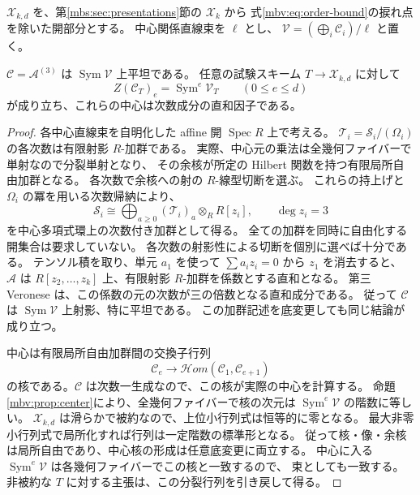 $\mathcal X_{k,d}$ を、第\ref{mbs:sec:presentations}節の $\mathcal X_k$ から
式\eqref{mbv:eq:order-bound}の捩れ点を除いた開部分とする。
中心関係直線束を $\ell$ とし、
$\mathcal V=(\bigoplus_i\mathcal C_i)/\ell$ と置く。

\begin{lemma}[相対中心多項式環上の平坦性]
\label{mbv:lem:relative-center}
$\mathcal C=\mathcal A^{(3)}$ は
$\operatorname{Sym}\mathcal V$ 上平坦である。
任意の試験スキーム $T\to\mathcal X_{k,d}$ に対して
\[
 Z(\mathcal C_T)_e=\operatorname{Sym}^e\mathcal V_T
 \qquad(0\leq e\leq d)
\]
が成り立ち、これらの中心は次数成分の直和因子である。
\end{lemma}
\begin{proof}
各中心直線束を自明化した affine 開 $\operatorname{Spec}R$ 上で考える。
$\mathcal T_i=\mathcal S_i/(\Omega_i)$ の各次数は有限射影 $R$-加群である。
実際、中心元の乗法は全幾何ファイバーで単射なので分裂単射となり、
その余核が所定の Hilbert 関数を持つ有限局所自由加群となる。
各次数で余核への射の $R$-線型切断を選ぶ。
これらの持上げと $\Omega_i$ の冪を用いる次数帰納により、
\[
 \mathcal S_i\cong
 \bigoplus_{a\geq0}(\mathcal T_i)_a\otimes_RR[z_i],
 \qquad \deg z_i=3
\]
を中心多項式環上の次数付き加群として得る。
全ての加群を同時に自由化する開集合は要求していない。
各次数の射影性による切断を個別に選べば十分である。
テンソル積を取り、単元 $a_1$ を使って $\sum a_i z_i=0$ から $z_1$ を消去すると、
$\mathcal A$ は $R[z_2,\ldots,z_k]$ 上、有限射影 $R$-加群を係数とする直和となる。
第三 Veronese は、この係数の元の次数が三の倍数となる直和成分である。
従って $\mathcal C$ は $\operatorname{Sym}\mathcal V$ 上射影、特に平坦である。
この加群記述を底変更しても同じ結論が成り立つ。

中心は有限局所自由加群間の交換子行列
\[
 \mathcal C_e\longrightarrow
 \mathcal Hom(\mathcal C_1,\mathcal C_{e+1})
\]
の核である。$\mathcal C$ は次数一生成なので、この核が実際の中心を計算する。
命題\ref{mbv:prop:center}により、全幾何ファイバーで核の次元は
$\operatorname{Sym}^e\mathcal V$ の階数に等しい。
$\mathcal X_{k,d}$ は滑らかで被約なので、上位小行列式は恒等的に零となる。
最大非零小行列式で局所化すれば行列は一定階数の標準形となる。
従って核・像・余核は局所自由であり、中心核の形成は任意底変更に両立する。
中心に入る $\operatorname{Sym}^e\mathcal V$ は各幾何ファイバーでこの核と一致するので、
束としても一致する。非被約な $T$ に対する主張は、この分裂行列を引き戻して得る。
\end{proof}

